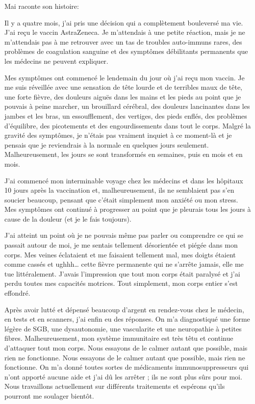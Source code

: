 Mai raconte son histoire:

Il y a quatre mois, j'ai pris une décision qui a complètement bouleversé ma
vie. J'ai reçu le vaccin AstraZeneca. Je m'attendais à une petite réaction, mais
je ne m'attendais pas à me retrouver avec un tas de troubles auto-immuns rares,
des problèmes de coagulation sanguine et des symptômes débilitants permanents
que les médecins ne peuvent expliquer.

Mes symptômes ont commencé le lendemain du jour où j'ai reçu mon vaccin. Je me
suis réveillée avec une sensation de tête lourde et de terribles maux de tête,
une forte fièvre, des douleurs aiguës dans les mains et les pieds au point que
je pouvais à peine marcher, un brouillard cérébral, des douleurs lancinantes
dans les jambes et les bras, un essoufflement, des vertiges, des pieds enflés,
des problèmes d'équilibre, des picotements et des engourdissements dans tout le
corps. Malgré la gravité des symptômes, je n'étais pas vraiment inquiet à ce
moment-là et je pensais que je reviendrais à la normale en quelques jours
seulement. Malheureusement, les jours se sont transformés en semaines, puis en
mois et en mois.

J'ai commencé mon interminable voyage chez les médecins et dans les hôpitaux 10
jours après la vaccination et, malheureusement, ils ne semblaient pas s'en
soucier beaucoup, pensant que c'était simplement mon anxiété ou mon stress. Mes
symptômes ont continué à progresser au point que je pleurais tous les jours à
cause de la douleur (et je le fais toujours).

J'ai atteint un point où je ne pouvais même pas parler ou comprendre ce qui se
passait autour de moi, je me sentais tellement désorientée et piégée dans mon
corps. Mes veines éclataient et me faisaient tellement mal, mes doigts étaient
comme cassés et ughhh… cette fièvre permanente qui ne s'arrête jamais, elle me
tue littéralement. J'avais l'impression que tout mon corps était paralysé et
j'ai perdu toutes mes capacités motrices. Tout simplement, mon corps entier
s'est effondré.

Après avoir lutté et dépensé beaucoup d'argent en rendez-vous chez le médecin,
en tests et en scanners, j'ai enfin eu des réponses. On m'a diagnostiqué une
forme légère de SGB, une dysautonomie, une vascularite et une neuropathie à
petites fibres. Malheureusement, mon système immunitaire est très têtu et
continue d'attaquer tout mon corps. Nous essayons de le calmer autant que
possible, mais rien ne fonctionne. Nous essayons de le calmer autant que
possible, mais rien ne fonctionne. On m'a donné toutes sortes de médicaments
immunosuppresseurs qui n'ont apporté aucune aide et j'ai dû les arrêter ; ils ne
sont plus sûrs pour moi. Nous travaillons actuellement sur différents
traitements et espérons qu'ils pourront me soulager bientôt.

